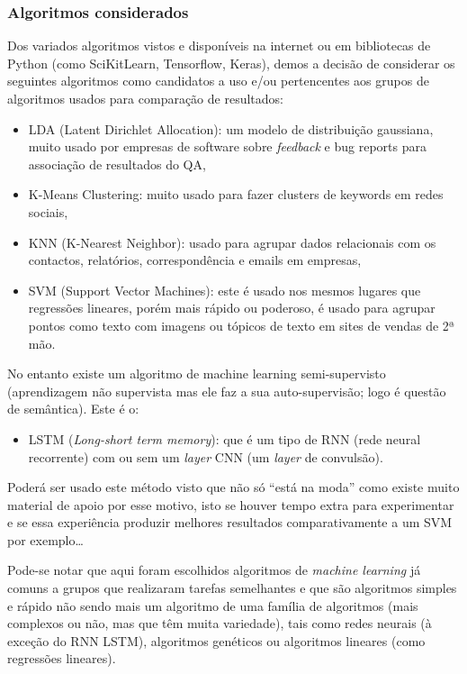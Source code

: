 \documentclass[a4paper,10pt]{article}
\begin{document}
\subsubsection{Algoritmos considerados}

Dos variados algoritmos vistos e disponíveis na internet ou em bibliotecas de Python (como SciKitLearn, Tensorflow, Keras), demos a decisão de considerar os seguintes algoritmos como candidatos a uso e/ou pertencentes aos grupos de algoritmos usados para comparação de resultados:
\begin{itemize}
    \item LDA (Latent Dirichlet Allocation): um modelo de distribuição gaussiana, muito usado por empresas de software sobre \textit{feedback} e bug reports para associação de resultados do QA,
    \item K-Means Clustering: muito usado para fazer clusters de keywords em redes sociais,
    \item KNN (K-Nearest Neighbor): usado para agrupar dados relacionais com os contactos, relatórios, correspondência e emails em empresas,
    \item SVM (Support Vector Machines): este é usado nos mesmos lugares que regressões lineares, porém mais rápido ou poderoso, é usado para agrupar pontos como texto com imagens ou tópicos de texto em sites de vendas de 2ª mão.
\end{itemize}

No entanto existe um algoritmo de machine learning semi-supervisto (aprendizagem não supervista mas ele faz a sua auto-supervisão; logo é questão de semântica).
Este é o:
\begin{itemize}
  \item LSTM (\textit{Long-short term memory}): que é um tipo de RNN (rede neural recorrente) com ou sem um \textit{layer} CNN (um \textit{layer} de convulsão).
\end{itemize}

Poderá ser usado este método visto que não só ``está na moda'' como existe muito material de apoio por esse motivo, isto se houver tempo extra para experimentar e se essa experiência produzir melhores resultados comparativamente a um SVM por exemplo\ldots

Pode-se notar que aqui foram escolhidos algoritmos de \textit{machine learning} já comuns a grupos que realizaram tarefas semelhantes e que são algoritmos simples e rápido não sendo mais um algoritmo de uma família de algoritmos (mais complexos ou não, mas que têm muita variedade), tais como redes neurais (à exceção do RNN LSTM), algoritmos genéticos ou algoritmos lineares (como regressões lineares).
\end{document}
